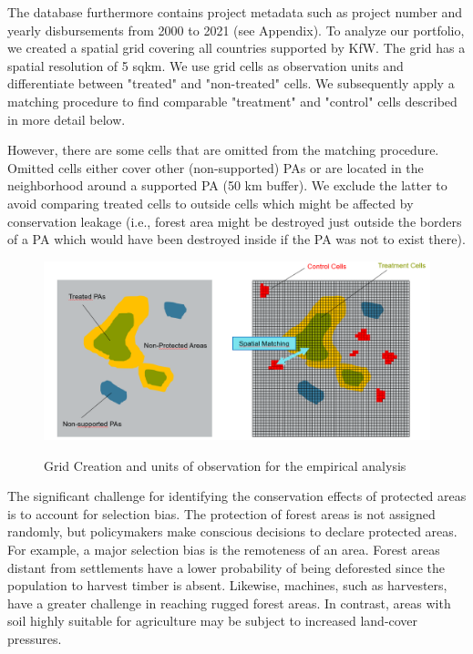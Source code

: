 \documentclass{article}
\begin{document}
The database furthermore contains project metadata such as project number and yearly disbursements from 2000 to 2021 (see Appendix). To analyze our portfolio, we created a spatial grid covering all countries supported by KfW. The grid has a spatial resolution of 5 sqkm. We use grid cells as observation units and differentiate between "treated" and "non-treated" cells. We subsequently apply a matching procedure to find comparable "treatment" and "control" cells described in more detail below.

However, there are some cells that are omitted from the matching procedure. Omitted cells either cover other (non-supported) PAs or are located in the neighborhood around a supported PA (50 km buffer). We exclude the latter to avoid comparing treated cells to outside cells which might be affected by conservation leakage (i.e., forest area might be destroyed just outside the borders of a PA which would have been destroyed inside if the PA was not to exist there).
\begin{figure}[H]
\centering
\caption{Grid Creation and units of observation for the empirical analysis}
\includegraphics[width=0.8\linewidth]{"figures/landscape-segmentation"}
\label{fig:PAs}
\end{figure}







The significant challenge for identifying the conservation effects of protected areas is to account for selection bias. The protection of forest areas is not assigned randomly, but policymakers make conscious decisions to declare protected areas. For example, a major selection bias is the remoteness of an area. Forest areas distant from settlements have a lower probability of being deforested since the population to harvest timber is absent. Likewise, machines, such as harvesters, have a greater challenge in reaching rugged forest areas. In contrast, areas with soil highly suitable for agriculture may be subject to increased land-cover pressures.
\end{document}
